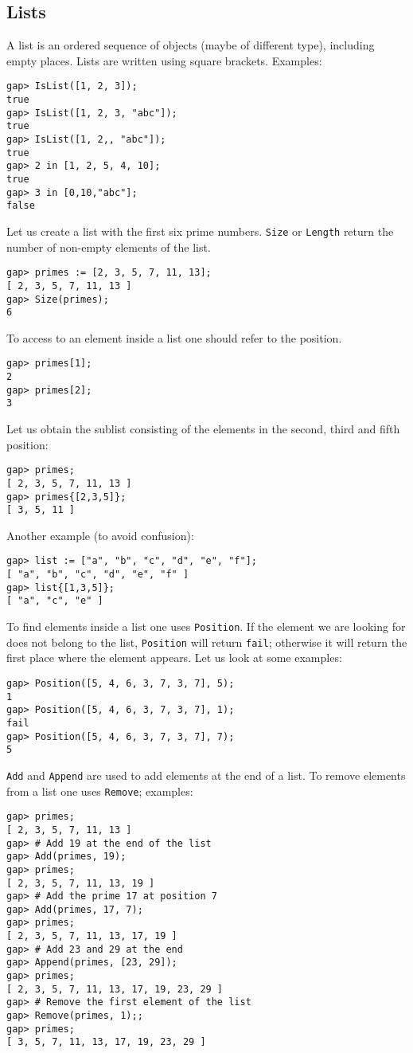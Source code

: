 \subsection*{Lists}

A list is an ordered sequence of objects (maybe of different type), including
empty places. Lists are written using square brackets. Examples:
\begin{lstlisting}
gap> IsList([1, 2, 3]);
true
gap> IsList([1, 2, 3, "abc"]);
true
gap> IsList([1, 2,, "abc"]);
true
gap> 2 in [1, 2, 5, 4, 10];
true
gap> 3 in [0,10,"abc"];
false
\end{lstlisting}

\begin{example}
Let us create a list with the first six prime numbers. \lstinline{Size} or
\lstinline{Length} return the number of non-empty elements of the list. 
\begin{lstlisting}
gap> primes := [2, 3, 5, 7, 11, 13];
[ 2, 3, 5, 7, 11, 13 ]
gap> Size(primes);
6
\end{lstlisting}
To access to an element inside a list one should refer to the position. 
\begin{lstlisting}
gap> primes[1];
2
gap> primes[2];
3
\end{lstlisting}
Let us obtain the sublist consisting of the elements in the second, third and
fifth position:
\begin{lstlisting}
gap> primes;
[ 2, 3, 5, 7, 11, 13 ]
gap> primes{[2,3,5]};
[ 3, 5, 11 ]
\end{lstlisting}
Another example (to avoid confusion):
\begin{lstlisting}
gap> list := ["a", "b", "c", "d", "e", "f"];
[ "a", "b", "c", "d", "e", "f" ]
gap> list{[1,3,5]};
[ "a", "c", "e" ]
\end{lstlisting}
To find elements inside a list one uses \lstinline{Position}. If the element we
are looking for does not belong to the list, \lstinline{Position} will return
\lstinline{fail}; otherwise it will return the first place where the element
appears. Let us look at some examples:
\begin{lstlisting}
gap> Position([5, 4, 6, 3, 7, 3, 7], 5);
1
gap> Position([5, 4, 6, 3, 7, 3, 7], 1);
fail
gap> Position([5, 4, 6, 3, 7, 3, 7], 7);
5
\end{lstlisting}

\lstinline{Add} and \lstinline{Append} are used to add elements at the end of a
list. To remove elements from a list one uses \lstinline{Remove}; examples:
\begin{lstlisting}
gap> primes;
[ 2, 3, 5, 7, 11, 13 ]
gap> # Add 19 at the end of the list 
gap> Add(primes, 19);
gap> primes;
[ 2, 3, 5, 7, 11, 13, 19 ]
gap> # Add the prime 17 at position 7
gap> Add(primes, 17, 7); 
gap> primes;
[ 2, 3, 5, 7, 11, 13, 17, 19 ]
gap> # Add 23 and 29 at the end
gap> Append(primes, [23, 29]);
gap> primes;
[ 2, 3, 5, 7, 11, 13, 17, 19, 23, 29 ]
gap> # Remove the first element of the list
gap> Remove(primes, 1);;
gap> primes;
[ 3, 5, 7, 11, 13, 17, 19, 23, 29 ]
\end{lstlisting}
\end{example}

